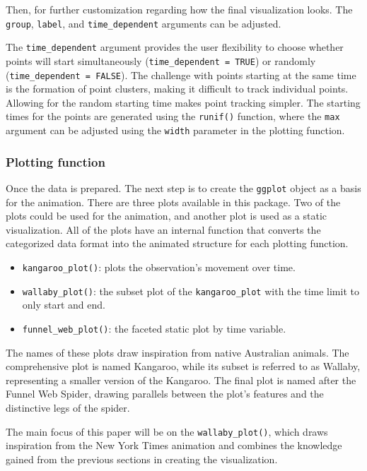 Then, for further customization regarding how the final visualization looks. The \texttt{group}, \texttt{label}, and \texttt{time\_dependent} arguments can be adjusted.

The \texttt{time\_dependent} argument provides the user flexibility to choose whether points will start simultaneously (\texttt{time\_dependent\ =\ TRUE}) or randomly (\texttt{time\_dependent\ =\ FALSE}). The challenge with points starting at the same time is the formation of point clusters, making it difficult to track individual points. Allowing for the random starting time makes point tracking simpler. The starting times for the points are generated using the \texttt{runif()} function, where the \texttt{max} argument can be adjusted using the \texttt{width} parameter in the plotting function.

\hypertarget{plotting-function}{%
\subsubsection{Plotting function}\label{plotting-function}}

Once the data is prepared. The next step is to create the \texttt{ggplot} object as a basis for the animation. There are three plots available in this package. Two of the plots could be used for the animation, and another plot is used as a static visualization. All of the plots have an internal function that converts the categorized data format into the animated structure for each plotting function.

\begin{itemize}
\tightlist
\item
  \texttt{kangaroo\_plot()}: plots the observation's movement over time.
\item
  \texttt{wallaby\_plot()}: the subset plot of the \texttt{kangaroo\_plot} with the time limit to only start and end.
\item
  \texttt{funnel\_web\_plot()}: the faceted static plot by time variable.
\end{itemize}

The names of these plots draw inspiration from native Australian animals. The comprehensive plot is named Kangaroo, while its subset is referred to as Wallaby, representing a smaller version of the Kangaroo. The final plot is named after the Funnel Web Spider, drawing parallels between the plot's features and the distinctive legs of the spider.

The main focus of this paper will be on the \texttt{wallaby\_plot()}, which draws inspiration from the New York Times animation and combines the knowledge gained from the previous sections in creating the visualization.


